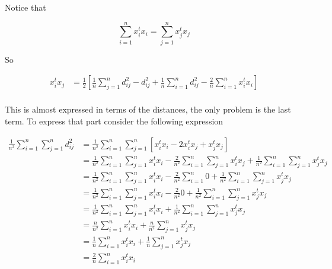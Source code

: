 \documentclass{article}
\begin{document}
    Notice that

    \begin{equation*}
        \sum_{i=1}^n x_i^t x_i = \sum_{j=1}^n x_j^t x_j
    \end{equation*}

    So

    \begin{equation*}
        \begin{aligned}
            x_i^t x_j&=
            \frac{1}{2} \left[ \frac{1}{n} \sum_{j=1}^n d_{ij}^2 - d_{ij}^2 + \frac{1}{n} \sum_{i=1}^n d_{ij}^2 - \frac{2}{n} \sum_{i=1}^n x_i^t x_i \right]\\
        \end{aligned}
    \end{equation*}

    This is almost expressed in terms of the distances, the only problem is the
    last term. To express that part consider the following expression

    \begin{equation*}
        \begin{aligned}
            \frac{1}{n^2}\sum_{i=1}^n \sum_{j=1}^n d_{ij}^2
            &= 
            \frac{1}{n^2}\sum_{i=1}^n \sum_{j=1}^n [x_i^t x_i - 2 x_i^t x_j + x_j^t x_j]\\
            &= 
            \frac{1}{n^2}\sum_{i=1}^n \sum_{j=1}^n x_i^t x_i - \frac{2}{n^2}\sum_{i=1}^n \sum_{j=1}^n x_i^t x_j +  \frac{1}{n^2}\sum_{i=1}^n \sum_{j=1}^nx_j^t x_j\\
            &= 
            \frac{1}{n^2}\sum_{i=1}^n \sum_{j=1}^n x_i^t x_i - \frac{2}{n^2}\sum_{i=1}^n 0 +  \frac{1}{n^2}\sum_{i=1}^n \sum_{j=1}^nx_j^t x_j\\
            &= 
            \frac{1}{n^2}\sum_{i=1}^n \sum_{j=1}^n x_i^t x_i - \frac{2}{n^2} 0 +  \frac{1}{n^2}\sum_{i=1}^n \sum_{j=1}^nx_j^t x_j\\
            &= 
            \frac{1}{n^2}\sum_{i=1}^n \sum_{j=1}^n x_i^t x_i +  \frac{1}{n^2}\sum_{i=1}^n \sum_{j=1}^nx_j^t x_j\\
            &= 
            \frac{n}{n^2}\sum_{i=1}^n x_i^t x_i +  \frac{n}{n^2}\sum_{j=1}^n x_j^t x_j\\
            &= 
            \frac{1}{n}\sum_{i=1}^n x_i^t x_i +  \frac{1}{n}\sum_{j=1}^n x_j^t x_j\\
            &= 
            \frac{2}{n}\sum_{i=1}^n x_i^t x_i\\
        \end{aligned}
    \end{equation*}
\end{document}
